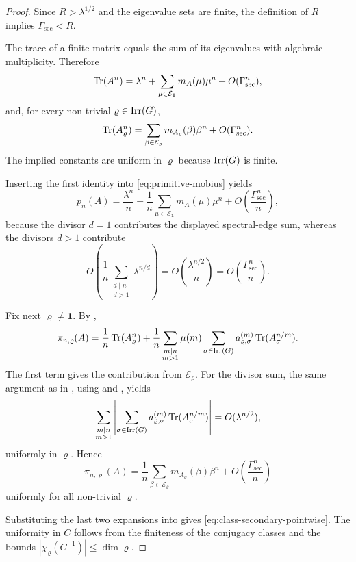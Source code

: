 \begin{proof}
  Since \(R>\lambda^{1/2}\) and the eigenvalue sets are finite, the
  definition of \(R\) implies \(\Gamma_{\mathrm{sec}}<R\).

  The trace of a finite matrix equals the sum of its eigenvalues with
  algebraic multiplicity. Therefore
  \[
    \operatorname{Tr}(A^n)
    =
    \lambda^n
    +\sum_{\mu\in\mathcal E_{\mathbf 1}}m_A(\mu)\mu^n
    +O(\Gamma_{\mathrm{sec}}^n),
  \]
  and, for every non-trivial \(\varrho\in\operatorname{Irr}(G)\),
  \[
    \operatorname{Tr}(A_\varrho^n)
    =
    \sum_{\beta\in\mathcal E_\varrho}m_{A_\varrho}(\beta)\beta^n
    +O(\Gamma_{\mathrm{sec}}^n).
  \]
  The implied constants are uniform in \(\varrho\) because \(\operatorname{Irr}(G)\)
  is finite.

  Inserting the first identity into \eqref{eq:primitive-mobius} yields
  \[
    p_n(A)
    =
    \frac{\lambda^n}{n}
    +\frac{1}{n}\sum_{\mu\in\mathcal E_{\mathbf 1}}m_A(\mu)\mu^n
    +O\!\left(\frac{\Gamma_{\mathrm{sec}}^n}{n}\right),
  \]
  because the divisor \(d=1\) contributes the displayed spectral-edge
  sum, whereas the divisors \(d>1\) contribute
  \[
    O\!\left(
      \frac{1}{n}\sum_{\substack{d\mid n\\ d>1}}\lambda^{n/d}
    \right)
    =
    O\!\left(\frac{\lambda^{n/2}}{n}\right)
    =
    O\!\left(\frac{\Gamma_{\mathrm{sec}}^n}{n}\right).
  \]

  Fix next \(\varrho\neq\mathbf 1\). By
  ,
  \[
    \pi_{n,\varrho}(A)
    =
    \frac{1}{n}\operatorname{Tr}(A_\varrho^n)
    +\frac{1}{n}
      \sum_{\substack{m\mid n\\ m>1}}\mu(m)
        \sum_{\sigma\in\operatorname{Irr}(G)}
          a_{\varrho,\sigma}^{(m)}\operatorname{Tr}(A_\sigma^{n/m}).
  \]
  The first term gives the contribution from \(\mathcal E_\varrho\). For
  the divisor sum, the same argument as in
  , using
   and
  , yields
  \[
    \sum_{\substack{m\mid n\\ m>1}}
      \left|
        \sum_{\sigma\in\operatorname{Irr}(G)}
          a_{\varrho,\sigma}^{(m)}\operatorname{Tr}(A_\sigma^{n/m})
      \right|
    =
    O(\lambda^{n/2}),
  \]
  uniformly in \(\varrho\). Hence
  \[
    \pi_{n,\varrho}(A)
    =
    \frac{1}{n}
      \sum_{\beta\in\mathcal E_\varrho}m_{A_\varrho}(\beta)\beta^n
    +O\!\left(\frac{\Gamma_{\mathrm{sec}}^n}{n}\right)
  \]
  uniformly for all non-trivial \(\varrho\).

  Substituting the last two expansions into
   gives
  \eqref{eq:class-secondary-pointwise}. The uniformity in \(C\) follows
  from the finiteness of the conjugacy classes and the bounds
  \(|\chi_\varrho(C^{-1})|\le \dim\varrho\).


\end{proof}
